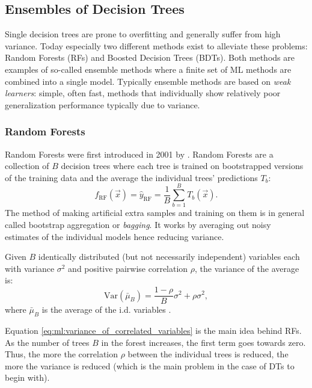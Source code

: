 \subsection{Ensembles of Decision Trees}
\label{subsec:ml:multiple_decision_trees}
Single decision trees are prone to overfitting and generally suffer from high variance. Today especially two different methods exist to alleviate these problems: Random Forests (RFs) and Boosted Decision Trees (BDTs). Both methods are examples of so-called ensemble methods where a finite set of ML methods are combined into a single model. Typically ensemble methods are based on \emph{weak learners}: simple, often fast, methods that individually show relatively poor generalization performance typically due to variance. 

\subsubsection{Random Forests}
\label{subsubsec:ml:random_forest}
Random Forests were first introduced in 2001 by \citet{breimanRandomForests2001}. Random Forests are a collection of $B$ decision trees where each tree is trained on bootstrapped versions of the training data and the average the individual trees' predictions $T_b$: 
\begin{equation}
  f_\mathrm{RF}(\vec{x}) = \hat{y}_\mathrm{RF} = \frac{1}{B}  \sum_{b=1}^B T_b(\vec{x}).
\end{equation}
The method of making artificial extra samples and training on them is in general called bootstrap aggregation or \emph{bagging}\autocite{hastieElementsStatisticalLearning2009}. It works by averaging out noisy estimates of the individual models hence reducing variance. 
\begin{theorem}
  Given $B$ identically distributed (but not necessarily independent) variables each with variance $\sigma^2$ and positive pairwise correlation $\rho$, the variance of the average is:
  \begin{equation}
    \label{eq:ml:variance_of_correlated_variables}
    \mathrm{Var}(\bar{\mu}_B) = \frac{1-\rho}{B} \sigma^2 + \rho \sigma^2,
  \end{equation}
  where $\bar{\mu}_B$ is the average of the i.d. variables \autocite{hastieElementsStatisticalLearning2009}. %
\end{theorem}
Equation \eqref{eq:ml:variance_of_correlated_variables} is the main idea behind RFs. As the number of trees $B$ in the forest increases, the first term goes towards zero. Thus, the more the correlation $\rho$ between the individual trees is reduced, the more the variance is reduced (which is the main problem in the case of DTs to begin with). 

